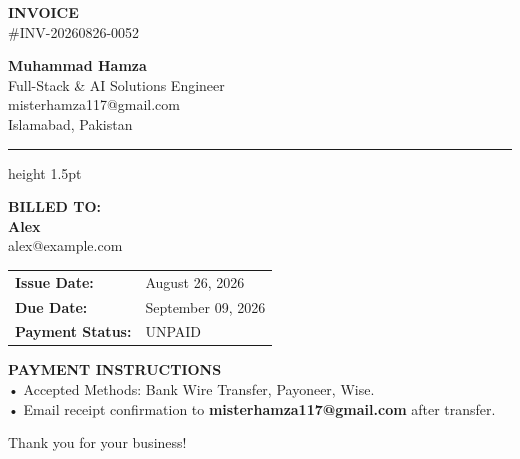 \documentclass[11pt,a4paper]{article}
\begin{document}
\begin{minipage}{0.5\textwidth}
    {\Huge \bfseries \color{navy} INVOICE} \\[4pt]
    {\color{gray} \#INV-20260826-0052}
\end{minipage}
\begin{minipage}{0.5\textwidth}
    \begin{flushright}
        {\Large \bfseries Muhammad Hamza} \\[2pt]
        Full-Stack \& AI Solutions Engineer \\
        misterhamza117@gmail.com \\
        Islamabad, Pakistan
    \end{flushright}
\end{minipage}

\vspace{1.5em}
\hrule height 1.5pt
\vspace{1.5em}

\begin{minipage}{0.5\textwidth}
    {\bfseries \color{navy} BILLED TO:} \\[4pt]
    {\Large \bfseries Alex} \\[2pt]
    alex@example.com
\end{minipage}
\begin{minipage}{0.5\textwidth}
    \begin{flushright}
        \begin{tabular}{ll}
            \textbf{Issue Date:} & August 26, 2026 \\
            \textbf{Due Date:} & September 09, 2026 \\
            \textbf{Payment Status:} & UNPAID
        \end{tabular}
    \end{flushright}
\end{minipage}

\vspace{2em}


\vspace{1.5em}


\vspace{3em}

\textbf{PAYMENT INSTRUCTIONS} \\[4pt]
• Accepted Methods: Bank Wire Transfer, Payoneer, Wise. \\
• Email receipt confirmation to \textbf{misterhamza117@gmail.com} after transfer.

\vfill
\begin{center}
    {\color{gray} Thank you for your business!}
\end{center}
\end{document}
